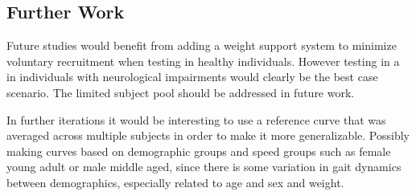 \subsection{Further Work}
Future studies would benefit from adding a weight support system to minimize voluntary recruitment when testing in healthy individuals. However testing in a in individuals with neurological impairments would clearly be the best case scenario. The limited subject pool should be addressed in future work.

In further iterations it would be interesting to use a reference curve that was averaged across multiple subjects in order to make it more generalizable. Possibly making curves based on demographic groups and speed groups such as female young adult or male middle aged, since there is some variation in gait dynamics between demographics, especially related to age and sex and weight.

